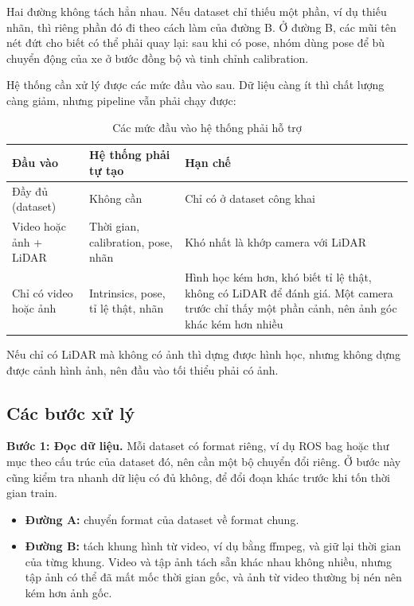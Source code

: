 Hai đường không tách hẳn nhau. Nếu dataset chỉ thiếu một phần, ví dụ thiếu nhãn, thì riêng phần đó đi theo cách làm của đường B.
Ở đường B, các mũi tên nét đứt cho biết có thể phải quay lại: sau khi có pose, nhóm dùng pose để bù chuyển động của xe ở bước đồng bộ và tinh chỉnh calibration.

Hệ thống cần xử lý được các mức đầu vào sau. Dữ liệu càng ít thì chất lượng càng giảm, nhưng pipeline vẫn phải chạy được:

\begin{table}[H]
  \centering
  \small
  \caption{Các mức đầu vào hệ thống phải hỗ trợ}
  \begin{tabularx}{\linewidth}{>{\raggedright\arraybackslash}p{3.3cm} >{\raggedright\arraybackslash}X >{\raggedright\arraybackslash}X}
    \toprule
    \textbf{Đầu vào} & \textbf{Hệ thống phải tự tạo} & \textbf{Hạn chế} \\
    \midrule
    Đầy đủ (dataset) & Không cần & Chỉ có ở dataset công khai \\
    \addlinespace
    Video hoặc ảnh + LiDAR & Thời gian, calibration, pose, nhãn & Khó nhất là khớp camera với LiDAR \\
    \addlinespace
    Chỉ có video hoặc ảnh & Intrinsics, pose, tỉ lệ thật, nhãn & Hình học kém hơn, khó biết tỉ lệ thật, không có LiDAR để đánh giá. Một camera trước chỉ thấy một phần cảnh, nên ảnh góc khác kém hơn nhiều \\
    \bottomrule
  \end{tabularx}
\end{table}

Nếu chỉ có LiDAR mà không có ảnh thì dựng được hình học, nhưng không dựng được cảnh hình ảnh, nên đầu vào tối thiểu phải có ảnh.

\subsection{Các bước xử lý}

\textbf{Bước 1: Đọc dữ liệu.}
Mỗi dataset có format riêng, ví dụ ROS bag hoặc thư mục theo cấu trúc của dataset đó, nên cần một bộ chuyển đổi riêng.
Ở bước này cũng kiểm tra nhanh dữ liệu có đủ không, để đổi đoạn khác trước khi tốn thời gian train.
\begin{itemize}
  \item \textbf{Đường A:} chuyển format của dataset về format chung.
  \item \textbf{Đường B:} tách khung hình từ video, ví dụ bằng ffmpeg, và giữ lại thời gian của từng khung. Video và tập ảnh tách sẵn khác nhau không nhiều, nhưng tập ảnh có thể đã mất mốc thời gian gốc, và ảnh từ video thường bị nén nên kém hơn ảnh gốc.
\end{itemize}

